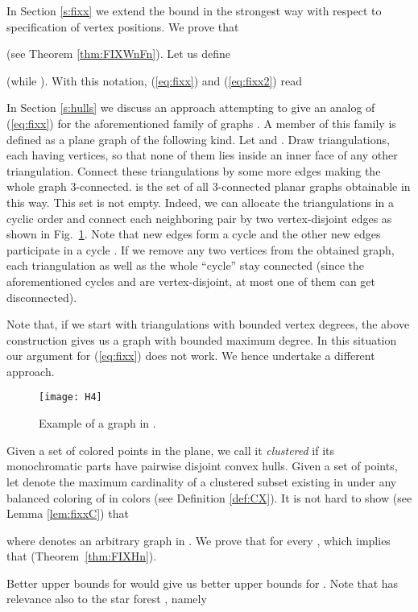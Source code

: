 \documentclass[reqno,12pt]{amsart}
\newcommand{\refeq}[1]{(\ref{eq:#1})}
\begin{document}
In Section \ref{s:fixx} we extend the bound
 in the strongest way with respect to specification
of vertex positions. We prove that

(see Theorem \ref{thm:FIXWnFn}).
Let us define

(while ).
With this notation, \refeq{fixx} and \refeq{fixx2} read


In Section \ref{s:hulls} we discuss an approach attempting to give
an analog of \refeq{fixx} for the aforementioned family of graphs
. A member of this family is defined as a plane graph of the
following kind. 
Let  and . Draw  triangulations, each having  vertices,
so that none of them lies inside an inner face of any other
triangulation. Connect these triangulations by some more edges making
the whole graph 3-connected.
 is the set of all 3-connected planar graphs obtainable in this way.
This set is not empty. Indeed, we can allocate the  triangulations in a
cyclic order and connect each neighboring pair by two vertex-disjoint edges
as shown in Fig.~\ref{fig:Gk4}. Note that  new edges form a cycle 
and the other  new edges participate in a cycle . 
If we remove any two vertices from the obtained graph,
each triangulation as well as the whole ``cycle'' stay connected
(since the aforementioned cycles  and  are vertex-disjoint,
at most one of them can get disconnected).

Note that, if we start with triangulations with bounded vertex degrees, 
the above construction gives us a graph with bounded maximum degree.
In this situation our argument for \refeq{fixx}
does not work. We hence undertake a different approach.

\begin{figure}
\centerline{\texttt{[image: H4]}}
\caption{Example of a graph in .}
\label{fig:Gk4}
\end{figure}

Given a set of colored points in the plane, we
call it \emph{clustered} if its monochromatic parts have pairwise disjoint
convex hulls. Given a set  of  points, let  denote
the maximum cardinality of a clustered subset existing in 
under any balanced coloring of  in  colors (see Definition \ref{def:CX}).
It is not hard to show (see Lemma \ref{lem:fixxC}) that

where  denotes an arbitrary graph in .
We prove that  for every , which implies that  
(Theorem~\ref{thm:FIXHn}).

Better upper bounds for  would give us better upper bounds for .
Note that  has relevance also to the star forest , namely
\end{document}
